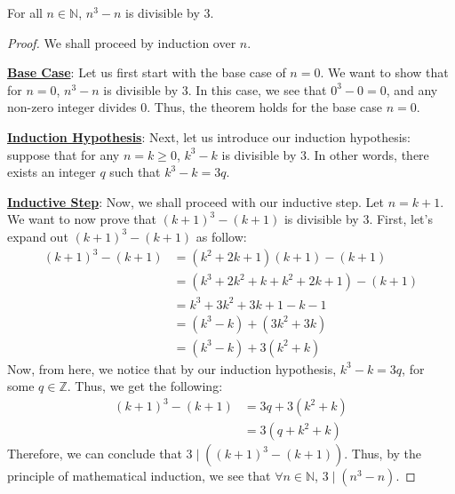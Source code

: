 \documentclass[openany]{book}
\begin{document}
\begin{thm}
	For all $n\in\mathbb{N}$, $n^3-n$ is divisible by 3.
\end{thm}
\begin{proof}
	We shall proceed by induction over $n$.
	
	\textbf{\underline{Base Case}}: Let us first start with the base case of $n=0$. We want to show that for $n=0$, $n^3-n$ is divisible by $3$. In this case, we see that $0^3 - 0=0$, and any non-zero integer divides 0. Thus, the theorem holds for the base case $n=0$.
	
	\textbf{\underline{Induction Hypothesis}}: Next, let us introduce our induction hypothesis: suppose that for any $n=k\geq 0$, $k^3-k$ is divisible by $3$. In other words, there exists an integer $q$ such that $k^3-k=3q$.
	
	\textbf{\underline{Inductive Step}}: Now, we shall proceed with our inductive step. Let $n=k+1$. We want to now prove that $(k+1)^3-(k+1)$ is divisible by 3. First, let's expand out $(k+1)^3-(k+1)$ as follow:
	\begin{align*}
		(k+1)^3 - (k+1) &= (k^2+2k+1)(k+1) - (k+1) \\
		&= (k^3 + 2k^2 + k + k^2 + 2k + 1) - (k+1) \\
		&= k^3 + 3k^2 + 3k + 1 - k - 1 \\
		&= (k^3 - k) + (3k^2 + 3k) \\
		&= (k^3 - k) + 3(k^2 + k)
	\end{align*}
	Now, from here, we notice that by our induction hypothesis, $k^3-k=3q$, for some $q\in\mathbb{Z}$. Thus, we get the following:
	\begin{align*}
		(k+1)^3-(k+1) &= 3q + 3(k^2+k) \\
		&= 3(q+k^2+k)
	\end{align*}
	Therefore, we can conclude that $3\mid((k+1)^3-(k+1))$. Thus, by the principle of mathematical induction, we see that $\forall n\in\mathbb{N}$, $3\mid (n^3 - n)$.
\end{proof}
\end{document}
